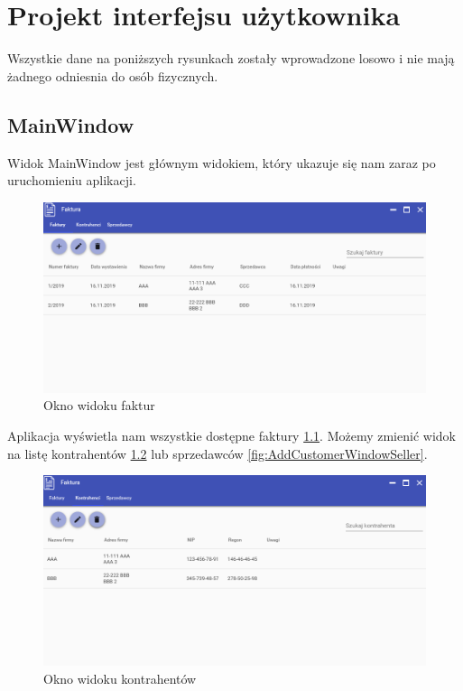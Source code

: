\chapter{Projekt interfejsu użytkownika}
Wszystkie dane na poniższych rysunkach zostały wprowadzone losowo i nie mają żadnego odniesnia do osób fizycznych.

\section{MainWindow}
Widok MainWindow jest głównym widokiem, który ukazuje się nam zaraz po uruchomieniu aplikacji. 

\begin{figure}[ht!]
\centering
  \includegraphics[width=\linewidth]{Rysunki/Main/InvoiceView.png}
  \caption{Okno widoku faktur}
  \label{fig:AddCustomerWindowInvoice}
\end{figure}

Aplikacja wyświetla nam wszystkie dostępne faktury \ref{fig:AddCustomerWindowInvoice}. Możemy zmienić widok na listę kontrahentów \ref{fig:AddCustomerWindowContractor} lub sprzedawców \ref{fig:AddCustomerWindowSeller}. 

\begin{figure}[ht!]
\centering
  \includegraphics[width=\linewidth]{Rysunki/Main/contractorView.png}
  \caption{Okno widoku kontrahentów}
  \label{fig:AddCustomerWindowContractor}
\end{figure}

